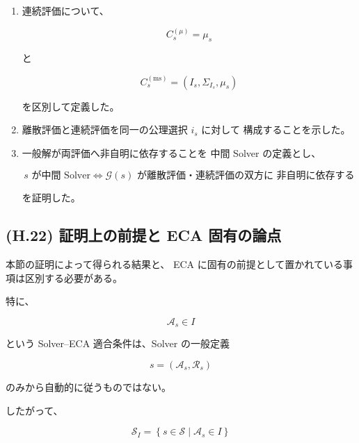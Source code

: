 \documentclass[a4paper,11pt]{article}
\begin{document}
\begin{enumerate}[label=\textup{(\arabic*)}]
    \item
    連続評価について、

    \begin{equation}
        C_s^{(\mu)}
        =
        \mu_s
    \end{equation}

    と

    \begin{equation}
        C_s^{(\mathrm{ms})}
        =
        (I_s,\Sigma_{I_s},\mu_s)
    \end{equation}

    を区別して定義した。

    \item
    離散評価と連続評価を同一の公理選択 $i_s$ に対して
    構成することを示した。

    \item
    一般解が両評価へ非自明に依存することを
    中間 Solver の定義とし、

    \begin{equation}
        s\text{ が中間 Solver}
        \iff
        \mathcal{G}(s)
        \text{ が離散評価・連続評価の双方に
        非自明に依存する}
    \end{equation}

    を証明した。

\end{enumerate}


\subsection{(H.22) 証明上の前提と ECA 固有の論点}
\label{subsec:H22}

本節の証明によって得られる結果と、
ECA に固有の前提として置かれている事項は区別する必要がある。

特に、

\begin{equation}
    \mathcal{A}_s\in I
\end{equation}

という Solver--ECA 適合条件は、Solver の一般定義

\begin{equation}
    s=(\mathcal{A}_s,\mathcal{R}_s)
\end{equation}

のみから自動的に従うものではない。

したがって、

\begin{equation}
    \boxed{
        \mathcal{S}_I
        =
        \left\{
            s\in\mathcal{S}
            \mid
            \mathcal{A}_s\in I
        \right\}
    }
\end{equation}
\end{document}
